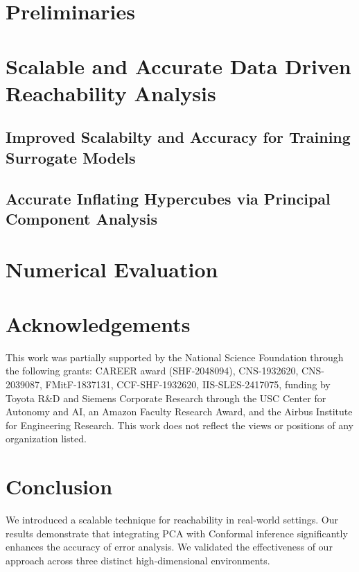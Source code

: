 \documentclass[twoside,11pt]{article}
\begin{document}
\section{Preliminaries}
\label{sec:prelim}


\section{Scalable and Accurate Data Driven Reachability Analysis}
\label{sec:DDReach}


\vspace{-2mm}
\subsection{Improved Scalabilty and Accuracy for Training  Surrogate Models}
\label{sec:Training}
\vspace{-2mm}


\vspace{-2mm}
\subsection{Accurate Inflating Hypercubes  via Principal Component Analysis }
\label{sec:PCA}
\vspace{-2mm}


\vspace{-6mm}
\section{Numerical Evaluation}
\label{sec:Experiments}


\section{Acknowledgements}
This work was partially supported by the National Science Foundation through the following grants: CAREER award (SHF-2048094), CNS-1932620, CNS-2039087, FMitF-1837131, CCF-SHF-1932620, IIS-SLES-2417075, funding by Toyota R\&D and Siemens Corporate Research through the USC Center for Autonomy and AI, an Amazon Faculty Research Award, and the Airbus Institute for Engineering Research. This work does not reflect the views or positions of any organization listed.

\section{Conclusion}
We introduced a scalable technique for reachability in real-world settings. Our results demonstrate that integrating PCA with Conformal inference significantly enhances the accuracy of error analysis. We validated the effectiveness of our approach across three distinct high-dimensional environments.


% 


\appendix


\end{document}
